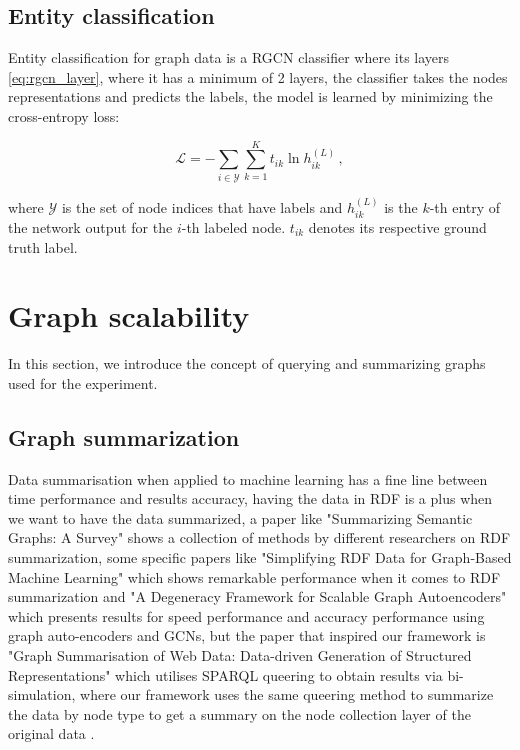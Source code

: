 \documentclass[11pt]{article}
\begin{document}
\subsection{Entity classification}
 Entity classification for graph data is a RGCN classifier where its layers  \eqref{eq:rgcn_layer}, where it has a minimum of 2 layers, the classifier takes the nodes representations and predicts the labels, the model is learned by minimizing the cross-entropy loss:

\begin{equation}
\mathcal{L}= -\sum_{i\in\mathcal{Y}}\sum_{k=1}^K t_{ik} \ln h_{ik}^{(L)}  \, ,
\label{eq:loss}
\end{equation} 

where $\mathcal{Y}$ is the set of node indices that have labels and $h_{ik}^{(L)}$ is the $k$-th entry of the network output for the $i$-th labeled node. $t_{ik}$ denotes its respective ground truth label. 

\section{Graph scalability}
In this section, we introduce the concept of querying and summarizing graphs used for the experiment. 

\subsection{Graph summarization}
Data summarisation when applied to machine learning has a fine line between time performance and results accuracy, having the data in RDF is a plus when we want to have the data summarized, a paper like "Summarizing Semantic Graphs: A Survey" \cite{Cebiric2019} shows a collection of methods by different researchers on RDF summarization, some specific papers like "Simplifying RDF Data for Graph-Based Machine Learning" \cite{Bloeam2014simplifrdf} which shows remarkable performance when it comes to RDF summarization and "A Degeneracy Framework for Scalable Graph Autoencoders" \cite{salha2019degeneracy} which presents results for speed performance and accuracy performance using graph auto-encoders and GCNs, but the paper that inspired our framework is "Graph Summarisation of Web Data: Data-driven Generation of Structured Representations"\cite{Campinas2016GraphSO} which utilises SPARQL queering to obtain results via bi-simulation, where our framework uses the same queering method to summarize the data by node type to get a summary on the node collection layer of the original data \cite{6327436}.
\end{document}
